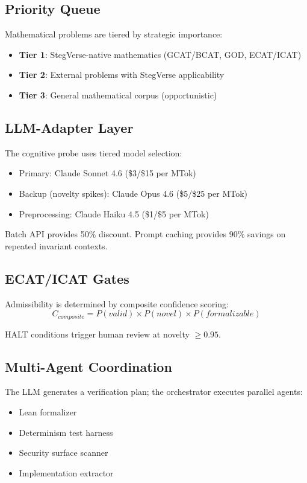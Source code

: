\documentclass[11pt,a4paper]{article}
\theoremstyle{definition}
\begin{document}
\subsection{Priority Queue}

Mathematical problems are tiered by strategic importance:

\begin{itemize}
    \item \textbf{Tier 1}: StegVerse-native mathematics (GCAT/BCAT, GOD, ECAT/ICAT)
    \item \textbf{Tier 2}: External problems with StegVerse applicability
    \item \textbf{Tier 3}: General mathematical corpus (opportunistic)
\end{itemize}

\subsection{LLM-Adapter Layer}

The cognitive probe uses tiered model selection:
\begin{itemize}
    \item Primary: Claude Sonnet 4.6 (\$3/\$15 per MTok)
    \item Backup (novelty spikes): Claude Opus 4.6 (\$5/\$25 per MTok)
    \item Preprocessing: Claude Haiku 4.5 (\$1/\$5 per MTok)
\end{itemize}

Batch API provides 50\% discount. Prompt caching provides 90\% savings on 
repeated invariant contexts.

\subsection{ECAT/ICAT Gates}

Admissibility is determined by composite confidence scoring:
\begin{equation}
    C_{composite} = P(valid) \times P(novel) \times P(formalizable)
\end{equation}

HALT conditions trigger human review at novelty $\geq 0.95$.

\subsection{Multi-Agent Coordination}

The LLM generates a verification plan; the orchestrator executes parallel agents:
\begin{itemize}
    \item Lean formalizer
    \item Determinism test harness
    \item Security surface scanner
    \item Implementation extractor
\end{itemize}
\end{document}
